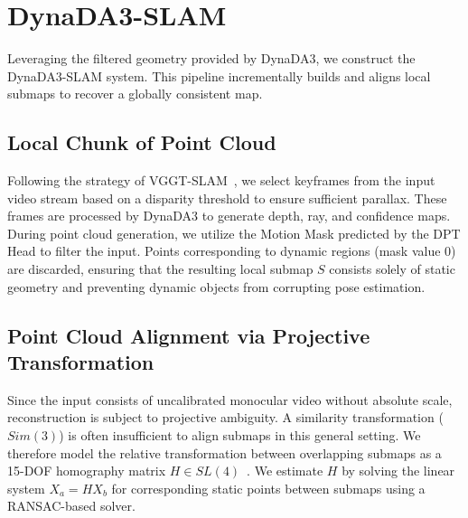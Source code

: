 \section{DynaDA3-SLAM}
\label{sec:slam_framework}
Leveraging the filtered geometry provided by DynaDA3, we construct the DynaDA3-SLAM system. This pipeline incrementally builds and aligns local submaps to recover a globally consistent map.
\subsection{Local Chunk of Point Cloud}
Following the strategy of VGGT-SLAM~\cite{maggio2025vggtslam}, we select keyframes from the input video stream based on a disparity threshold to ensure sufficient parallax. These frames are processed by DynaDA3 to generate depth, ray, and confidence maps. During point cloud generation, we utilize the Motion Mask predicted by the DPT Head to filter the input. Points corresponding to dynamic regions (mask value $0$) are discarded, ensuring that the resulting local submap $S$ consists solely of static geometry and preventing dynamic objects from corrupting pose estimation.
\subsection{Point Cloud Alignment via Projective Transformation}
Since the input consists of uncalibrated monocular video without absolute scale, reconstruction is subject to projective ambiguity. A similarity transformation ($Sim(3)$) is often insufficient to align submaps in this general setting. We therefore model the relative transformation between overlapping submaps as a 15-DOF homography matrix $H \in SL(4)$~\cite{maggio2025vggtslam}. We estimate $H$ by solving the linear system $X_a = H X_b$ for corresponding static points between submaps using a RANSAC-based solver.
